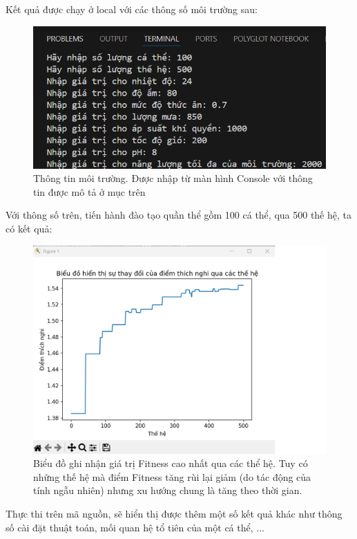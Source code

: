 	Kết quả được chạy ở local với các thông số môi trường sau:
	\begin{figure}[h]
		\centering
		\includegraphics{figures/env_infor.png}
		\caption{Thông tin môi trường. Được nhập từ màn hình Console với thông tin được mô tả ở mục trên}
		\label{fig:env_infor}
	\end{figure}
	
	Với thông số trên, tiến hành đào tạo quần thể gồm 100 cá thể, qua 500 thế hệ, ta có kết quả:
	\begin{figure}[h]
		\centering
		\includegraphics[scale=0.6]{figures/result.png}
		\caption{Biểu đồ ghi nhận giá trị Fitness cao nhất qua các thể hệ. Tuy có những thế hệ mà điểm Fitness tăng rùi lại giảm (do tác động của tính ngẫu nhiên) nhưng xu hướng chung là tăng theo thời gian.}
		\label{fig:result}
	\end{figure}
	
	Thực thi trên mã nguồn, sẽ hiển thị được thêm một số kết quả khác như thông số cài đặt thuật toán, mối quan hệ tổ tiên của một cá thể, ...